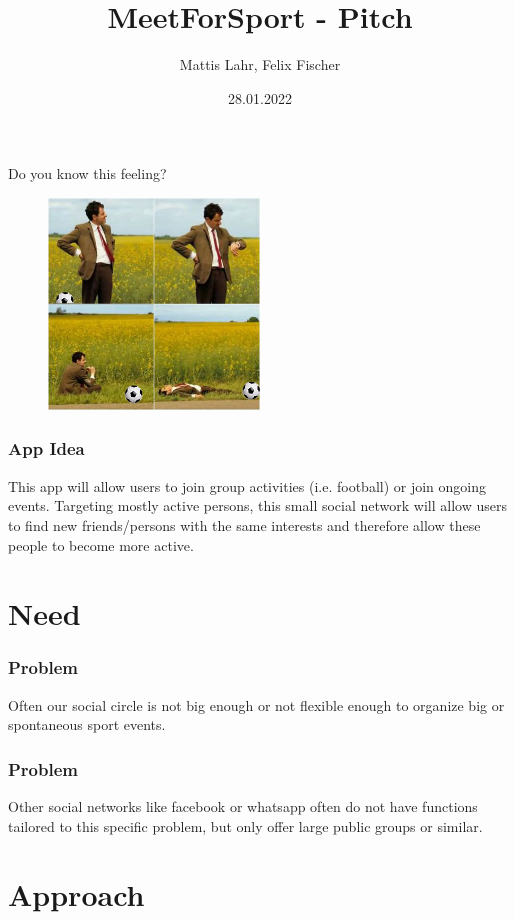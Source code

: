 \documentclass[aspectratio=169]{beamer}
\title{MeetForSport - Pitch}
\author{Mattis Lahr, Felix Fischer}
\date{28.01.2022}
\begin{document}
\maketitle



\begin{frame}
Do you know this feeling?
 \begin{figure}
		\centering
			\includegraphics[width=0.5\textwidth]{media/bean.jpg}
		\end{figure}
\end{frame}



\begin{frame}
\frametitle{App Idea}
This app will allow users to join group activities (i.e. football) or join ongoing events.
Targeting mostly active persons, this small social network will allow users  to find new friends/persons with the same interests and therefore allow these people to become more active.
\end{frame}

\section{Need}
	\begin{frame}
		\frametitle{Problem}
		Often our social circle is not big enough or not flexible enough to organize big or spontaneous sport events.
	\end{frame}

	\begin{frame}
		\frametitle{Problem}
		Other social networks like facebook or whatsapp often do not have functions tailored to this specific problem, but only offer large public groups or similar. 
	\end{frame}

\section{Approach}
\end{document}
